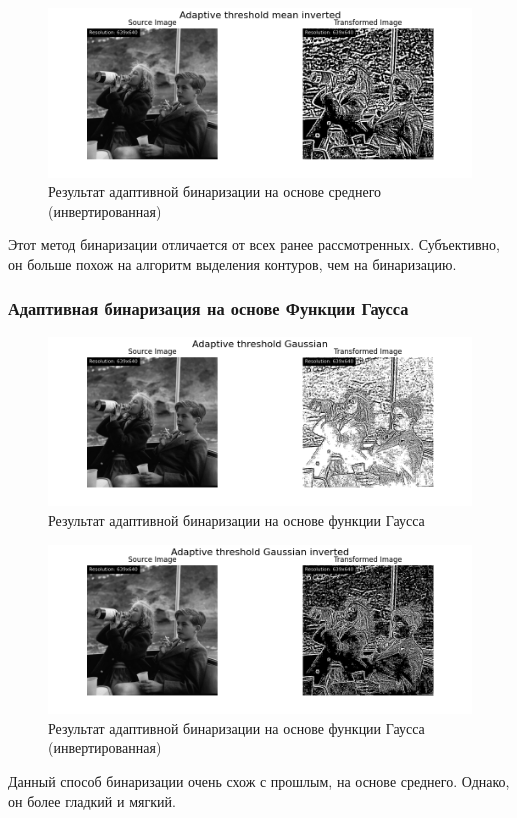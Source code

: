 \begin{figure}[ht!]
    \centering
    \includegraphics[width=\textwidth]{../results/Adaptive threshold mean inverted.png}
    \caption{Результат адаптивной бинаризации на основе среднего (инвертированная)}
    \label{img:adaptive_mean_inv}
\end{figure}

Этот метод бинаризации отличается от всех ранее рассмотренных. Субъективно, он больше похож на алгоритм выделения контуров, чем на бинаризацию. 
\FloatBarrier
\subsubsection{Адаптивная бинаризация на основе Функции Гаусса}

\begin{figure}[ht!]
    \centering
    \includegraphics[width=\textwidth]{../results/Adaptive threshold Gaussian.png}
    \caption{Результат адаптивной бинаризации на основе функции Гаусса}
    \label{img:adaptive_gaussian}
\end{figure}

\FloatBarrier
\begin{figure}[ht!]
    \centering
    \includegraphics[width=\textwidth]{../results/Adaptive threshold Gaussian inverted.png}
    \caption{Результат адаптивной бинаризации на основе функции Гаусса (инвертированная)}
    \label{img:adaptive_gaussian_inv}
\end{figure}

Данный способ бинаризации очень схож с прошлым, на основе среднего. Однако, он более гладкий и мягкий.

